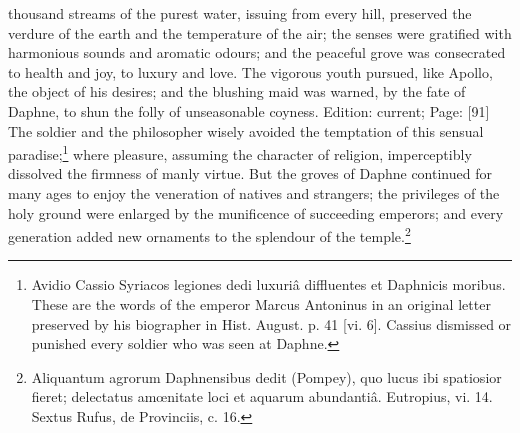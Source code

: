 thousand streams of the purest water, issuing from every hill, preserved the verdure of the earth and the temperature of the air; the senses were gratified with harmonious sounds and aromatic odours; and the peaceful grove was consecrated to health and joy, to luxury and love. The vigorous youth pursued, like Apollo, the object of his desires; and the blushing maid was warned, by the fate of Daphne, to shun the folly of unseasonable coyness. Edition: current; Page: [91] The soldier and the philosopher wisely avoided the temptation of this sensual paradise;\footnote{Avidio Cassio Syriacos legiones dedi luxuriâ diffluentes et Daphnicis moribus. These are the words of the emperor Marcus Antoninus in an original letter preserved by his biographer in Hist. August. p. 41 [vi. 6]. Cassius dismissed or punished every soldier who was seen at Daphne.} where pleasure, assuming the character of religion, imperceptibly dissolved the firmness of manly virtue. But the groves of Daphne continued for many ages to enjoy the veneration of natives and strangers; the privileges of the holy ground were enlarged by the munificence of succeeding emperors; and every generation added new ornaments to the splendour of the temple.\footnote{Aliquantum agrorum Daphnensibus dedit (Pompey), quo lucus ibi spatiosior fieret; delectatus amœnitate loci et aquarum abundantiâ. Eutropius, vi. 14. Sextus Rufus, de Provinciis, c. 16.}

